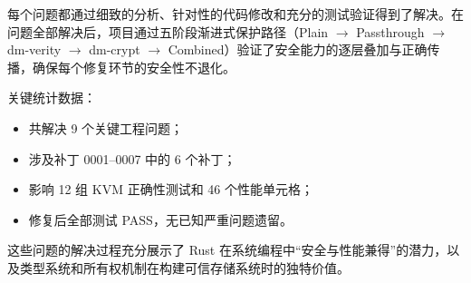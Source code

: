 每个问题都通过细致的分析、针对性的代码修改和充分的测试验证得到了解决。在问题全部解决后，项目通过五阶段渐进式保护路径（Plain $\to$ Passthrough $\to$ dm-verity $\to$ dm-crypt $\to$ Combined）验证了安全能力的逐层叠加与正确传播，确保每个修复环节的安全性不退化。

关键统计数据：
\begin{itemize}
    \item 共解决 9 个关键工程问题；
    \item 涉及补丁 0001--0007 中的 6 个补丁；
    \item 影响 12 组 KVM 正确性测试和 46 个性能单元格；
    \item 修复后全部测试 PASS，无已知严重问题遗留。
\end{itemize}

这些问题的解决过程充分展示了 Rust 在系统编程中“安全与性能兼得”的潜力，以及类型系统和所有权机制在构建可信存储系统时的独特价值。